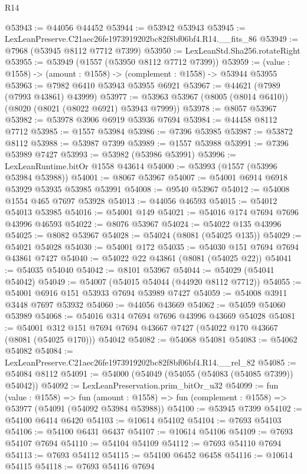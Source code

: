 \begin{lexlean}{R14}
\begin{coremodule}
@53943 := @44056 @44452
@53944 := @53942 @53943
@53945 := LexLeanPreserve.C21aec26fe1973919202bc82f8bf06bf4.R14.__fits_86
@53949 := @7968 (@53945 @8112 @7712 @7399)
@53950 := LexLeanStd.Sha256.rotateRight
@53955 := @53949 (@1557 (@53950 @8112 @7712 @7399))
@53959 := (value : @1558) -> (amount : @1558) -> (complement : @1558) -> @53944 @53955
@53963 := @7982 @6410 @53943 @53955 @6921
@53967 := @44621 (@7989 (@7993 @43861) @43999)
@53977 := @53963 @53967 (@8005 (@8014 @6410)) (@8020 (@8021 (@8022 @6921) @53943 @7999))
@53978 := @8057 @53967
@53982 := @53978 @3906 @6919 @53936 @7694
@53984 := @44458 @8112 @7712
@53985 := @1557 @53984
@53986 := @7396 @53985
@53987 := @53872 @8112
@53988 := @53987 @7399
@53989 := @1557 @53988
@53991 := @7396 @53989 @7427
@53993 := @53982 (@53986 @53991)
@53996 := LexLeanRuntime.bitOr @1558 @43614
@54000 := @53993 (@1557 (@53996 @53984 @53988))
@54001 := @8067 @53967
@54007 := @54001 @6914 @6918 @53929 @53935 @53985 @53991
@54008 := @9540 @53967
@54012 := @54008 @1554 @465 @7697 @53928
@54013 := @44056 @46593
@54015 := @54012 @54013 @53985
@54016 := @54001 @149
@54021 := @54016 @174 @7694 @7696 @43996 @46593
@54022 := @8076 @53967
@54024 := @54022 @135 @43996
@54025 := @8082 @53967
@54028 := @54024 (@8081 (@54025 @135))
@54029 := @54021 @54028
@54030 := @54001 @172
@54035 := @54030 @151 @7694 @7694 @43861 @7427
@54040 := @54022 @22 @43861 (@8081 (@54025 @22))
@54041 := @54035 @54040
@54042 := @8101 @53967
@54044 := @54029 (@54041 @54042)
@54049 := @54007 (@54015 @54044 (@44920 @8112 @7712))
@54055 := @54001 @6916 @151 @53933 @7694 @53989 @7427
@54059 := @54008 @3911 @3448 @7697 @53932
@54060 := @44056 @43669
@54062 := @54059 @54060 @53989
@54068 := @54016 @314 @7694 @7696 @43996 @43669 @54028
@54081 := @54001
    @312
    @151
    @7694
    @7694
    @43667
    @7427
    (@54022 @170 @43667 (@8081 (@54025 @170)))
    @54042
@54082 := @54068 @54081
@54083 := @54062 @54082
@54084 := LexLeanPreserve.C21aec26fe1973919202bc82f8bf06bf4.R14.__rel_82
@54085 := @54084 @8112
@54091 := @54000 (@54049 (@54055 (@54083 (@54085 @7399)) @54042))
@54092 := LexLeanPreservation.prim_bitOr_u32
@54099 := fun (value : @1558) =>
  fun (amount : @1558) => fun (complement : @1558) => @53977 (@54091 (@54092 @53984 @53988))
@54100 := @53945 @7399
@54102 := @54100 @6414 @6420
@54103 := @10614 @54102
@54104 := @7693 @54103
@54106 := @54100 @6431 @6437
@54107 := @10614 @54106
@54109 := @7693 @54107 @7694
@54110 := @54104 @54109
@54112 := @7693 @54110 @7694
@54113 := @7693 @54112
@54115 := @54100 @6452 @6458
@54116 := @10614 @54115
@54118 := @7693 @54116 @7694

\end{coremodule}
\end{lexlean}
